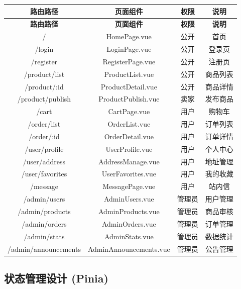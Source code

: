 \documentclass[12pt,a4paper,UTF8]{ctexart}
\begin{document}
\begin{longtable}{|c|c|c|c|}
    \hline
    \textbf{路由路径} & \textbf{页面组件} & \textbf{权限} & \textbf{说明} \\
    \hline
    \endfirsthead
    \hline
    \textbf{路由路径} & \textbf{页面组件} & \textbf{权限} & \textbf{说明} \\
    \hline
    \endhead
    \hline
    \endfoot

    / & HomePage.vue & 公开 & 首页 \\
    \hline
    /login & LoginPage.vue & 公开 & 登录页 \\
    \hline
    /register & RegisterPage.vue & 公开 & 注册页 \\
    \hline
    /product/list & ProductList.vue & 公开 & 商品列表 \\
    \hline
    /product/:id & ProductDetail.vue & 公开 & 商品详情 \\
    \hline
    /product/publish & ProductPublish.vue & 卖家 & 发布商品 \\
    \hline
    /cart & CartPage.vue & 用户 & 购物车 \\
    \hline
    /order/list & OrderList.vue & 用户 & 订单列表 \\
    \hline
    /order/:id & OrderDetail.vue & 用户 & 订单详情 \\
    \hline
    /user/profile & UserProfile.vue & 用户 & 个人中心 \\
    \hline
    /user/address & AddressManage.vue & 用户 & 地址管理 \\
    \hline
    /user/favorites & UserFavorites.vue & 用户 & 我的收藏 \\
    \hline
    /message & MessagePage.vue & 用户 & 站内信 \\
    \hline
    /admin/users & AdminUsers.vue & 管理员 & 用户管理 \\
    \hline
    /admin/products & AdminProducts.vue & 管理员 & 商品审核 \\
    \hline
    /admin/orders & AdminOrders.vue & 管理员 & 订单管理 \\
    \hline
    /admin/stats & AdminStats.vue & 管理员 & 数据统计 \\
    \hline
    /admin/announcements & AdminAnnouncements.vue & 管理员 & 公告管理 \\
    \hline
\end{longtable}

\subsection{状态管理设计 (Pinia)}
\end{document}
